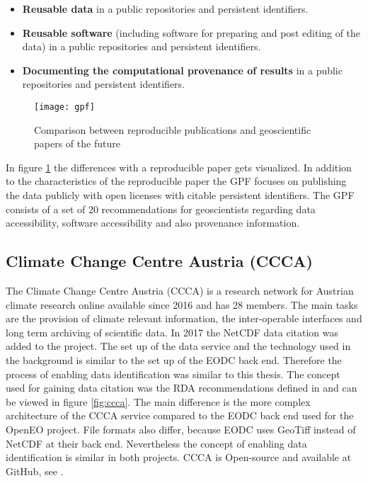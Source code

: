 \documentclass[draft,final]{vutinfth} %
\begin{document}
\begin{itemize}
	\item \textbf{Reusable data} in a public repositories and persistent identifiers.
	\item \textbf{Reusable software} (including software for preparing and post editing of the data) in a  public repositories and persistent identifiers.
	\item \textbf{Documenting the computational provenance of results} in a public repositories and persistent identifiers.  
\end{itemize}

\begin{figure}[h]
	\centering
	\texttt{[image: gpf]}
	\caption{Comparison between reproducible publications and geoscientific papers of the future \cite{Gil2016TowardTG}}
	\label{fig:gpf} %
\end{figure}

In figure \ref{fig:gpf} the differences with a reproducible paper gets visualized. In addition to the characteristics of the reproducible paper the GPF focuses on publishing the data publicly with open licenses with citable persistent identifiers.
The GPF consists of a set of 20 recommendations for geoscientists regarding data accessibility, software accessibility and also provenance information. 

\subsection{Climate Change Centre Austria (CCCA)}
The Climate Change Centre Austria (CCCA) is a research network for Austrian climate research online available since 2016 and has 28 members. The main tasks are the provision of climate relevant information, the inter-operable interfaces and long term archiving of scientific data. In 2017 the NetCDF data citation was added to the project. The set up of the data service and the technology used in the background is similar to the set up of the EODC back end. Therefore the process of enabling data identification was similar to this thesis. The concept used for gaining data citation was the RDA recommendations defined in \cite{rauber2016identification} and can be viewed in figure \ref{fig:ccca}. The main difference is the more complex architecture of the CCCA service compared to the EODC back end used for the OpenEO project. File formats also differ, because EODC uses GeoTiff instead of NetCDF at their back end. Nevertheless the concept of enabling data identification is similar in both projects.\cite{ccca} CCCA is Open-source and available at GitHub, see \cite{ccca_github}.  
\end{document}
